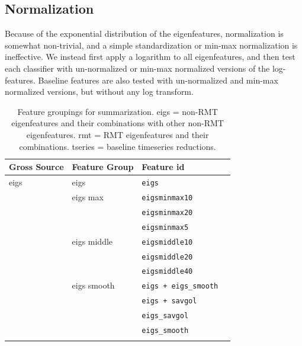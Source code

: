 \documentclass[12pt]{spieman}  %
\newcommand{\tcode}[1]{\footnotesize \texttt{#1} \normalsize}
\begin{document}
\begin{spacing}{2}
\subsection{Normalization}

Because of the exponential distribution of the eigenfeatures, normalization is
somewhat non-trivial, and a simple standardization or min-max normalization is
ineffective. We instead first apply a logarithm to all eigenfeatures, and then
test each classifier with un-normalized or min-max normalized versions of the
log-features. Baseline features are also tested with un-normalized and min-max
normalized versions, but without any log transform.


\begin{table}[h!]
\caption{
    Feature groupings for summarization. eigs = non-RMT eigenfeatures and their combinations with
    other non-RMT eigenfeatures. rmt = RMT eigenfeatures and their combinations. tseries = baseline
    timeseries reductions.\\
}
\label{tab:features}
\small
\centering
\begin{tabular}{lllr}
\hline
\textbf{Gross Source} & \textbf{Feature Group} & \textbf{Feature id}   \\
\hline
eigs           & eigs          & \tcode{eigs}                           \\
               & eigs max      & \tcode{eigsminmax10}                   \\
               &               & \tcode{eigsminmax20}                   \\
               &               & \tcode{eigsminmax5}                    \\
               & eigs middle   & \tcode{eigsmiddle10}                   \\
               &               & \tcode{eigsmiddle20}                   \\
               &               & \tcode{eigsmiddle40}                   \\
               & eigs smooth   & \tcode{eigs + eigs\_smooth}            \\
               &               & \tcode{eigs + savgol}                  \\
               &               & \tcode{eigs\_savgol}                   \\
               &               & \tcode{eigs\_smooth}                   \\
               &               &                                        \\

\end{tabular}
\end{table}
\end{spacing}
\end{document}

